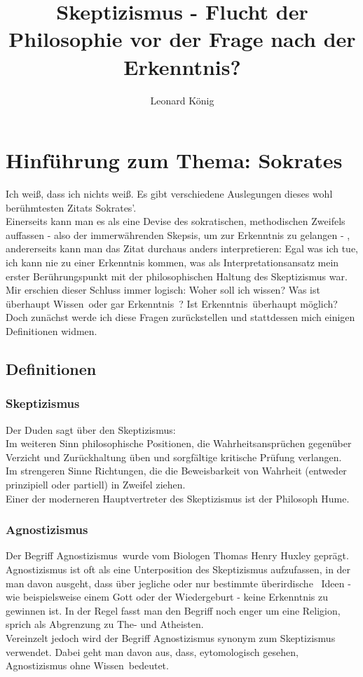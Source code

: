 \documentclass[12pt,a4paper]{article}
\author{Leonard König}
\title{Skeptizismus - Flucht der Philosophie vor der Frage nach der Erkenntnis?}
\begin{document}
\maketitle
\tableofcontents
\newpage
\section{Hinführung zum Thema: Sokrates}
\glqq Ich weiß, dass ich nichts weiß\grqq. Es gibt verschiedene Auslegungen dieses wohl berühmtesten Zitats Sokrates'.%
\\Einerseits kann man es als eine Devise des sokratischen, methodischen Zweifels auffassen - also der immerwährenden Skepsis, um zur Erkenntnis zu gelangen - , andererseits kann man das Zitat durchaus anders interpretieren: Egal was ich tue, ich kann nie zu einer Erkenntnis kommen, was als Interpretationsansatz mein erster Berührungspunkt mit der philosophischen Haltung des Skeptizismus war.\\
Mir erschien dieser Schluss immer logisch: Woher soll ich \glqq wissen\grqq? Was ist überhaupt \glqq Wissen\grqq\ oder gar \glqq Erkenntnis\grqq\ ? Ist \glqq Erkenntnis\grqq\ überhaupt möglich?\\
Doch zunächst werde ich diese Fragen zurückstellen und stattdessen mich einigen Definitionen widmen.
	\subsection{Definitionen}
		\subsubsection{Skeptizismus}
Der Duden sagt über den Skeptizismus:\\
\glqq Im weiteren Sinn philosophische Positionen, die Wahrheitsansprüchen gegenüber Verzicht und Zurückhaltung üben und sorgfältige kritische Prüfung verlangen.\\
Im strengeren Sinne Richtungen, die die Beweisbarkeit von Wahrheit (entweder prinzipiell oder partiell) in Zweifel ziehen.\grqq%
\\Einer der moderneren Hauptvertreter des Skeptizismus ist
der Philosoph Hume.\\%
		\subsubsection{Agnostizismus}
Der Begriff \glqq Agnostizismus\grqq\ wurde vom Biologen Thomas Henry Huxley geprägt. Agnostizismus ist oft als eine Unterposition des Skeptizismus aufzufassen, in der man davon ausgeht, dass über jegliche oder nur bestimmte überirdische%
\ Ideen - wie beispielsweise einem Gott oder der Wiedergeburt - keine Erkenntnis zu gewinnen ist. In der Regel fasst man den Begriff noch enger um eine Religion, sprich als Abgrenzung zu The- und Atheisten.\\ 
Vereinzelt jedoch wird der Begriff Agnostizismus synonym zum Skeptizismus verwendet. Dabei geht man davon aus, dass, eytomologisch gesehen, Agnostizismus \glqq ohne Wissen\grqq\ bedeutet.
\end{document}
